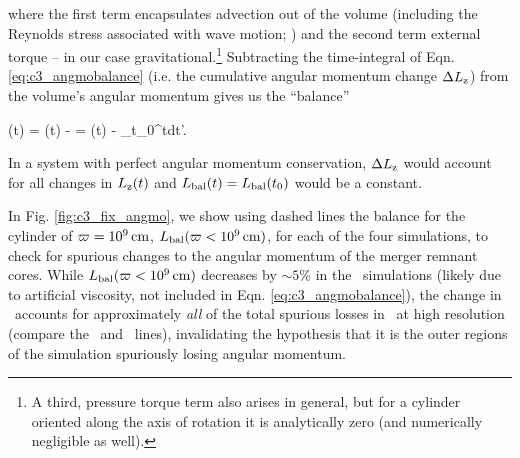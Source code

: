 

\noindent where the first term encapsulates advection out of the volume (including the Reynolds stress associated with wave motion; \citealt{papal95, balb03, kratl16}) and the second term external torque -- in our case gravitational.\footnote{A third, pressure torque term also arises in general, but for a cylinder oriented along the axis of rotation it is analytically zero (and numerically negligible as well).}  Subtracting the time-integral of Eqn. \ref{eq:c3_angmobalance} (i.e. the cumulative angular momentum change $\Delta \Lz$) from the volume's angular momentum gives us the ``balance''

\eqbegin
\Lbal(t) = \Lz(t) - \Delta \Lz = \Lz(t) - \int_{t_0}^{t}dt'.
\label{eq:c3_angmobalance2}
\eqend

\noindent In a system with perfect angular momentum conservation, $\Delta \Lz$ would account for all changes in $\Lz(t)$ and $\Lbal(t) = \Lbal(t_0)$ would be a constant.  

In Fig. \ref{fig:c3_fix_angmo}, we show using dashed lines the balance for the cylinder of $\varpi = 10^9\,\mathrm{cm}$, $\Lbal(\winnercyl)$, for each of the four simulations, to check for spurious changes to the angular momentum of the merger remnant cores.  While $\Lbal(\winnercyl)$ decreases by $\sim5$\% in the \gasoline\ simulations (likely due to artificial viscosity, not included in Eqn. \ref{eq:c3_angmobalance}), the change in \Lbal\ accounts for approximately \textit{all} of the total spurious losses in \arepo\ at high resolution (compare the \Lztot\ and \Lbal\ lines), invalidating the hypothesis that it is the outer regions of the simulation spuriously losing angular momentum.  

